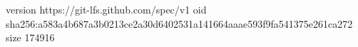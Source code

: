 version https://git-lfs.github.com/spec/v1
oid sha256:a583a4b687a3b0213ce2a30d6402531a141664aaae593f9fa541375e261ca272
size 174916
